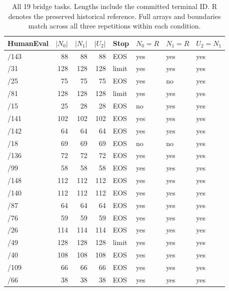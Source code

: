 \begin{table}[t]
\centering
\caption{All 19 bridge tasks. Lengths include the committed terminal ID. R denotes the preserved historical reference. Full arrays and boundaries match across all three repetitions within each condition.}
\label{tab:bridgeall}
\begin{tabular}{@{}lrrrllll@{}}
\toprule
HumanEval & $|N_0|$ & $|N_1|$ & $|U_2|$ & Stop & $N_0=R$ & $N_1=R$ & $U_2=N_1$ \\
\midrule
/143 & 88 & 88 & 88 & EOS & yes & yes & yes \\
/31 & 128 & 128 & 128 & limit & yes & yes & yes \\
/25 & 75 & 75 & 75 & EOS & yes & no & yes \\
/81 & 128 & 128 & 128 & limit & yes & yes & yes \\
/15 & 25 & 28 & 28 & EOS & no & yes & yes \\
/141 & 102 & 102 & 102 & EOS & yes & yes & yes \\
/142 & 64 & 64 & 64 & EOS & yes & yes & yes \\
/18 & 69 & 69 & 69 & EOS & no & no & yes \\
/136 & 72 & 72 & 72 & EOS & yes & yes & yes \\
/99 & 58 & 58 & 58 & EOS & yes & yes & yes \\
/148 & 112 & 112 & 112 & EOS & yes & yes & yes \\
/140 & 112 & 112 & 112 & EOS & yes & yes & yes \\
/87 & 64 & 64 & 64 & EOS & yes & yes & yes \\
/76 & 59 & 59 & 59 & EOS & yes & yes & yes \\
/26 & 114 & 114 & 114 & EOS & yes & yes & yes \\
/49 & 128 & 128 & 128 & limit & yes & yes & yes \\
/40 & 108 & 108 & 108 & EOS & yes & yes & yes \\
/109 & 66 & 66 & 66 & EOS & yes & yes & yes \\
/66 & 38 & 38 & 38 & EOS & yes & yes & yes \\
\bottomrule
\end{tabular}
\end{table}
